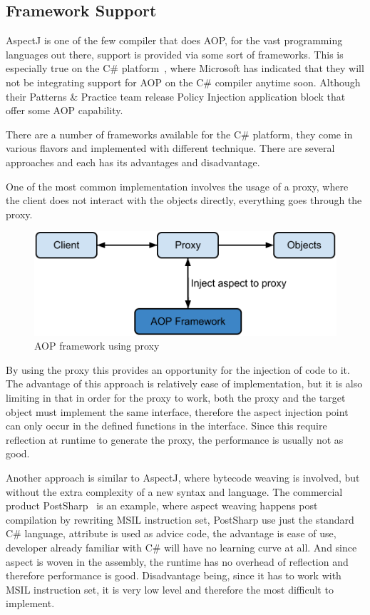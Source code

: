\subsection{Framework Support}

AspectJ is one of the few compiler that does AOP, for the vast programming languages out there, support is provided via some sort of frameworks. This is especially true on the C\# platform~\cite{aopcs}, where Microsoft has indicated that they will not be integrating support for AOP on the C\# compiler anytime soon. Although their Patterns \& Practice team release Policy Injection application block that offer some AOP capability.

There are a number of frameworks available for the C\# platform, they come in various flavors and implemented with different technique. There are several approaches and each has its advantages and disadvantage.

One of the most common implementation involves the usage of a proxy, where the client does not interact with the objects directly, everything goes through the proxy.

\begin{figure}[here]
  \includegraphics[scale=0.70]{proxy.png}
  \caption{AOP framework using proxy\label{proxy_model}}
\end{figure}

By using the proxy this provides an opportunity for the injection of code to it. The advantage of this approach is relatively ease of implementation, but it is also limiting in that in order for the proxy to work, both the proxy and the target object must implement the same interface, therefore the aspect injection point can only occur in the defined functions in the interface. Since this require reflection at runtime to generate the proxy, the performance is usually not as good.

Another approach is similar to AspectJ, where bytecode weaving is involved, but without the extra complexity of a new syntax and language. The commercial product PostSharp~\cite{postsharp} is an example, where aspect weaving happens post compilation by rewriting MSIL instruction set, PostSharp use just the standard C\# language, attribute is used as advice code, the advantage is ease of use, developer already familiar with C\# will have no learning curve at all. And since aspect is woven in the assembly, the runtime has no overhead of reflection and therefore performance is good. Disadvantage being, since it has to work with MSIL instruction set, it is very low level and therefore the most difficult to implement.

